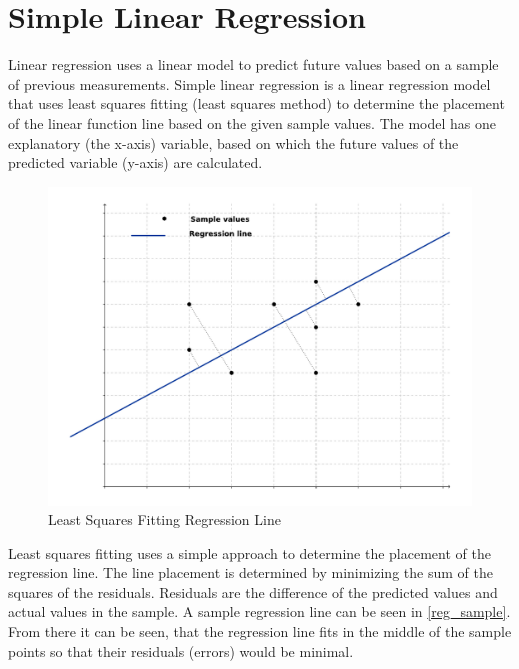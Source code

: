\section{Simple Linear Regression}

Linear regression uses a linear model to predict future values based on a sample of previous measurements. Simple linear regression is a linear regression model that uses least squares fitting (least squares method) \cite{least_squres} to determine the placement of the linear function line based on the given sample values. The model has one explanatory (the x-axis) variable, based on which the future values of the predicted variable (y-axis) are calculated.

\begin{figure}[h]
\centering
\includegraphics[scale=0.7]{2/figures/regression_sample.pdf}
\caption{Least Squares Fitting Regression Line}
\label{reg_sample}
\end{figure}

Least squares fitting uses a simple approach to determine the placement of the regression line. The line placement is determined by minimizing the sum of the squares of the residuals. Residuals are the difference of the predicted values and actual values in the sample. A sample regression line can be seen in \autoref{reg_sample}. From there it can be seen, that the regression line fits in the middle of the sample points so that their residuals (errors) would be minimal. 

